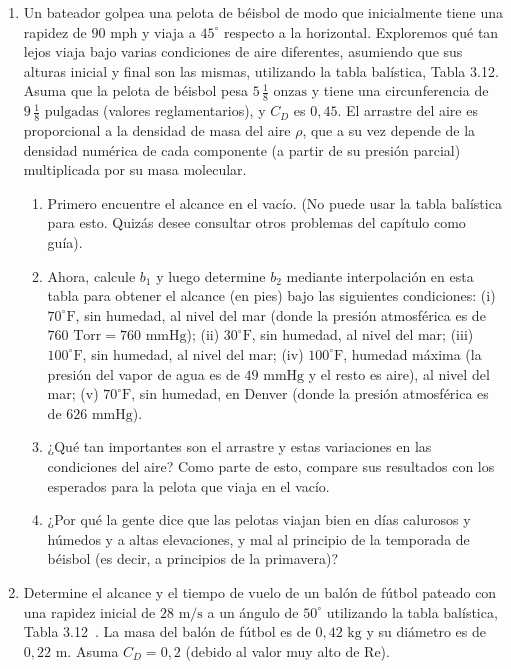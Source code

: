 \documentclass[12pt]{book}
\begin{document}
\begin{enumerate}
\item[3.103] Un bateador golpea una pelota de béisbol de modo que inicialmente tiene una rapidez de $90\text{ mph}$ y viaja a $45^\circ$ respecto a la horizontal. Exploremos qué tan lejos viaja bajo varias condiciones de aire diferentes, asumiendo que sus alturas inicial y final son las mismas, utilizando la tabla balística, Tabla 3.12. Asuma que la pelota de béisbol pesa $5\,\frac{1}{8}\text{ onzas}$ y tiene una circunferencia de $9\,\frac{1}{8}\text{ pulgadas}$ (valores reglamentarios), y $C_D$ es $0{,}45$. El arrastre del aire es proporcional a la densidad de masa del aire $\rho$, que a su vez depende de la densidad numérica de cada componente (a partir de su presión parcial) multiplicada por su masa molecular.
\begin{enumerate}
\item[(a)] Primero encuentre el alcance en el vacío. (No puede usar la tabla balística para esto. Quizás desee consultar otros problemas del capítulo como guía).
\item[(b)] Ahora, calcule $b_1$ y luego determine $b_2$ mediante interpolación en esta tabla para obtener el alcance (en pies) bajo las siguientes condiciones:
(i) $70^\circ\text{F}$, sin humedad, al nivel del mar (donde la presión atmosférica es de $760\text{ Torr} = 760\text{ mmHg}$);
(ii) $30^\circ\text{F}$, sin humedad, al nivel del mar;
(iii) $100^\circ\text{F}$, sin humedad, al nivel del mar;
(iv) $100^\circ\text{F}$, humedad máxima (la presión del vapor de agua es de $49\text{ mmHg}$ y el resto es aire), al nivel del mar;
(v) $70^\circ\text{F}$, sin humedad, en Denver (donde la presión atmosférica es de $626\text{ mmHg}$).
\item[(c)] ¿Qué tan importantes son el arrastre y estas variaciones en las condiciones del aire? Como parte de esto, compare sus resultados con los esperados para la pelota que viaja en el vacío.
\item[(d)] ¿Por qué la gente dice que las pelotas viajan bien en días calurosos y húmedos y a altas elevaciones, y mal al principio de la temporada de béisbol (es decir, a principios de la primavera)?
\end{enumerate}

\item[3.104] Determine el alcance y el tiempo de vuelo de un balón de fútbol pateado con una rapidez inicial de $28\text{ m/s}$ a un ángulo de $50^\circ$ utilizando la tabla balística, Tabla 3.12~\cite{ref37}. La masa del balón de fútbol es de $0{,}42\text{ kg}$ y su diámetro es de $0{,}22\text{ m}$. Asuma $C_D = 0{,}2$ (debido al valor muy alto de $\text{Re}$).


\end{enumerate}
\end{document}
